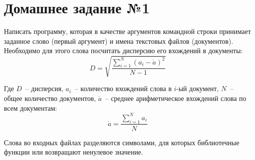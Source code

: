 \section*{Домашнее задание №1}

Написать программу, которая в качестве аргументов командной строки
принимает заданное слово (первый аргумент) и имена текстовых файлов
(документов). Необходимо для этого слова посчитать дисперсию его
вхождений в документы:
$$
	D=\sqrt{ \frac{ \sum^N_{i = 1}{ (a_i-\acute{a})^2 } }{ N - 1 } }
$$

Где $D$~-- дисперсия, $a_i$~-- количество вхождений слова в $i$-ый документ,
$N$~-- общее количество документов,
$\acute{a}$~-- среднее арифметическое вхождений слова по всем документам:
$$
	\acute{a} = \frac{ \sum^N_{i=1}{a_i} }{N}
$$

Слова во входных файлах разделяются символами, для которых
библиотечные функции  или  возвращают ненулевое
значение.
